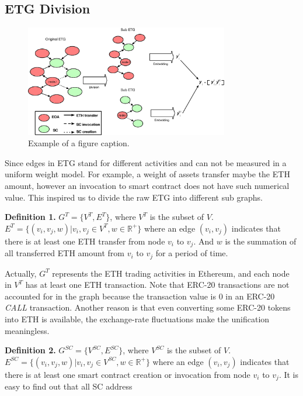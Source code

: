 \subsection{ETG Division}

\begin{figure}[htbp]
	\centering
	\label{fig}
	\includegraphics[width=3.5in]{fig/graph_split.eps}
	\caption{Example of a figure caption.}
\end{figure}

Since edges in ETG stand for different activities and can not be measured in a uniform weight model. For example, a weight of assets transfer maybe the ETH amount, however an invocation to smart contract does not have such numerical value. This inspired us to divide the raw ETG into different sub graphs.

\textbf{Definition 1.} $G^{T}=\{V^T,E^T\}$, where $V^T$ is the subset of $V$. $E^T=\{(v_i,v_j,w)|v_i,v_j \in V^T,w \in \mathbb{R^+}\}$ where an edge $(v_i,v_j)$ indicates that there is at least one ETH transfer from node $v_i$ to $v_j$. And $w$ is the summation of all transferred ETH amount from $v_i$ to $v_j$ for a period of time.

Actually, $G^T$ represents the ETH trading activities in Ethereum, and each node in $V^T$ has at least one ETH transaction. Note that ERC-20 transactions are not accounted for in the graph because the transaction value is $0$ in an ERC-20 \emph{CALL} transaction. Another reason is that even converting some ERC-20 tokens into ETH is available, the exchange-rate fluctuations make the unification meaningless.

\textbf{Definition 2.} $G^{SC}=\{V^{SC},E^{SC}\}$, where $V^{SC}$ is the subset of $V$. $E^{SC}=\{(v_i,v_j,w)|v_i,v_j \in V^{SC},w \in \mathbb{R^+}\}$ where an edge $(v_i,v_j)$ indicates that there is at least one smart contract creation or invocation from node $v_i$ to $v_j$. It is easy to find out that all SC address 

